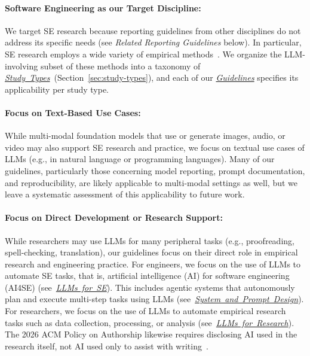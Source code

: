 \documentclass[smallextended]{svjour3}
\newif\ifpaper\papertrue
\newcommand{\studytypes}{\hyperref[sec:study-types]{\mbox{\emph{Study Types}}}\xspace}
\newcommand{\llmsforresearcher}{\hyperref[sec:llms-as-tools-for-software-engineering-researchers]{\mbox{\emph{LLMs for Research}}}\xspace}
\newcommand{\llmsforengineers}{\hyperref[sec:llms-as-tools-for-software-engineers]{\mbox{\emph{LLMs for SE}}}\xspace}
\newcommand{\studytypes}{\href{/study-types/}{\emph{Study Types}}\xspace}
\newcommand{\llmsforresearcher}{\href{/study-types/llms-for-research/}{\emph{LLMs for Research}}\xspace}
\newcommand{\llmsforengineers}{\href{/study-types/llms-for-se/}{\emph{LLMs for SE}}\xspace}
\newcommand{\guidelines}{\hyperref[sec:guidelines]{\mbox{\emph{Guidelines}}}\xspace}
\newcommand{\design}{\hyperref[sec:report-system-and-prompt-design]{\mbox{\emph{System and Prompt Design}}}\xspace}
\newcommand{\guidelines}{\href{/guidelines/}{\emph{Guidelines}}\xspace}
\newcommand{\design}{\href{/guidelines/design/}{\emph{System and Prompt Design}}\xspace}
\newcommand{\scopeparagraph}[1]{\paragraph{\bfseries #1:}}
\newcommand{\scopeparagraph}[1]{\subsubsection{#1}}
\begin{document}
\scopeparagraph{Software Engineering as our Target Discipline}

We target SE research because reporting guidelines from other disciplines do not address its specific needs (see \emph{Related Reporting Guidelines} below). In particular, SE research employs a wide variety of empirical methods~\cite{ralph2021empiricalstandardssoftwareengineering, DBLP:books/sp/WohlinRHORW24}. We organize the LLM-involving subset of these methods into a taxonomy of \studytypes\ifpaper~(Section~\ref{sec:study-types})\fi, and each of our \guidelines specifies its applicability per study type.

\scopeparagraph{Focus on Text-Based Use Cases}

While multi-modal foundation models that use or generate images, audio, or video may also support SE research and practice, we focus on textual use cases of LLMs (e.g., in natural language or programming languages). Many of our guidelines, particularly those concerning model reporting, prompt documentation, and reproducibility, are likely applicable to multi-modal settings as well, but we leave a systematic assessment of this applicability to future work.

\scopeparagraph{Focus on Direct Development or Research Support}

While researchers may use LLMs for many peripheral tasks (e.g., proofreading, spell-checking, translation), our guidelines focus on their direct role in empirical research and engineering practice.
For engineers, we focus on the use of LLMs to automate SE tasks, that is, artificial intelligence (AI) for software engineering (AI4SE) (see~\llmsforengineers).
This includes agentic systems that autonomously plan and execute multi-step tasks using LLMs (see~\design).
For researchers, we focus on the use of LLMs to automate empirical research tasks such as data collection, processing, or analysis (see~\llmsforresearcher).
The 2026 ACM Policy on Authorship likewise requires disclosing AI used in the research itself, not AI used only to assist with writing~\cite{ACM2026}.
\end{document}

